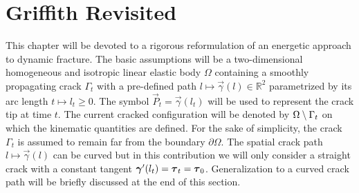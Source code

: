 \appendix

\chapter{Griffith Revisited} \label{chap:griffithrevis}
This chapter will be devoted to a rigorous reformulation of an energetic approach to dynamic fracture. The basic assumptions will be a two-dimensional homogeneous and isotropic linear elastic body $\Omega$ containing a smoothly propagating crack $\Gamma_t$ with a pre-defined path $l\mapsto\vec{\gamma}(l)\in\mathbb{R}^2$ parametrized by its arc length $t\mapsto l_t\geq 0$. The symbol $\vec{P}_t=\vec{\gamma}(l_t)$ will be used to represent the crack tip at time $t$. The current cracked configuration will be denoted by ${\Omega\setminus\Gamma_t}$ on which the kinematic quantities are defined. For the sake of simplicity, the crack $\Gamma_t$ is assumed to remain far from the boundary $\partial\Omega$. The spatial crack path $l\mapsto\vec{\gamma}(l)$ can be curved but in this contribution we will only consider a straight crack with a constant tangent $\vec{\gamma}'(l_t)=\vtau_t=\vtau_0$. Generalization to a curved crack path will be briefly discussed at the end of this section.

